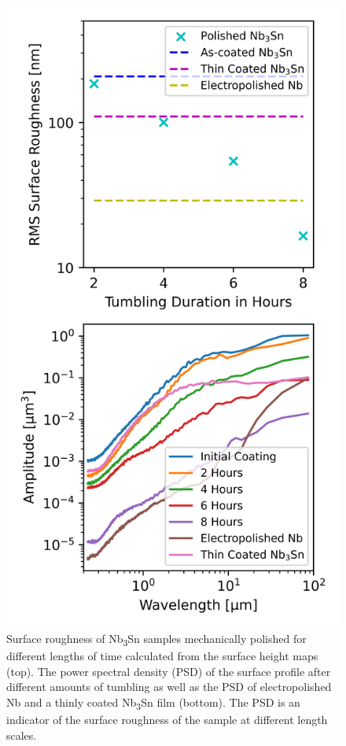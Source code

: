 \begin{figure}[t]%
\centering%
\includegraphics[width=0.8\columnwidth]{../doc/figs/Surface_Roughness_Graph.png}%
\caption{Surface roughness of Nb\textsubscript{3}Sn samples mechanically polished for different lengths of time calculated from the surface height maps (top). The power spectral density (PSD) of the surface profile after different amounts of tumbling as well as the PSD of electropolished Nb and a thinly coated Nb\textsubscript{3}Sn\cite{posen2021advances} film (bottom). The PSD is an indicator of the surface roughness of the sample at different length scales.}%
\label{fig:surfaceroughnessgraph}%
\end{figure}

%


